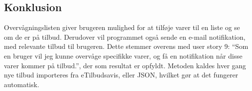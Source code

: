 \subsection{Konklusion}

Overvågningslisten giver brugeren mulighed for at tilføje varer til en liste og se om de er på tilbud. 
Derudover vil programmet også sende en e-mail notifikation, med relevante tilbud til brugeren. 
Dette stemmer overens med user story 9: ``Som en bruger vil jeg kunne overvåge specifikke varer, og få en notifikation når disse varer kommer på tilbud.'', der som resultat er opfyldt.
Metoden kaldes hver gang nye tilbud importeres fra eTilbudsavis, eller JSON, hvilket gør at det fungerer automatisk.
